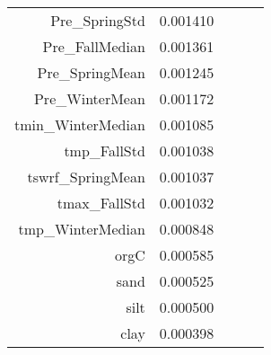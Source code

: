 \begin{tabular}{rrrrr}
Pre_SpringStd & 0.001410 \\
Pre_FallMedian & 0.001361 \\
Pre_SpringMean & 0.001245 \\
Pre_WinterMean & 0.001172 \\
tmin_WinterMedian & 0.001085 \\
tmp_FallStd & 0.001038 \\
tswrf_SpringMean & 0.001037 \\
tmax_FallStd & 0.001032 \\
tmp_WinterMedian & 0.000848 \\
orgC & 0.000585 \\
sand & 0.000525 \\
silt & 0.000500 \\
clay & 0.000398 \\
\bottomrule
\end{tabular}
